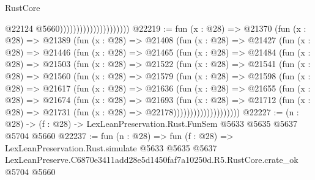\begin{lexlean}{RustCore}
\begin{coremodule}
                                              @22124
                                              @5660)))))))))))))))))))))
@22219 := fun (x : @28) =>
  @21370
    (fun (x : @28) =>
    @21389
      (fun (x : @28) =>
      @21408
        (fun (x : @28) =>
        @21427
          (fun (x : @28) =>
          @21446
            (fun (x : @28) =>
            @21465
              (fun (x : @28) =>
              @21484
                (fun (x : @28) =>
                @21503
                  (fun (x : @28) =>
                  @21522
                    (fun (x : @28) =>
                    @21541
                      (fun (x : @28) =>
                      @21560
                        (fun (x : @28) =>
                        @21579
                          (fun (x : @28) =>
                          @21598
                            (fun (x : @28) =>
                            @21617
                              (fun (x : @28) =>
                              @21636
                                (fun (x : @28) =>
                                @21655
                                  (fun (x : @28) =>
                                  @21674
                                    (fun (x : @28) =>
                                    @21693
                                      (fun (x : @28) =>
                                      @21712
                                        (fun (x : @28) =>
                                        @21731 (fun (x : @28) => @22178))))))))))))))))))))
@22227 := (n : @28) -> (f : @28) -> LexLeanPreservation.Rust.FunSem @5633 @5635 @5637 @5704 @5660
@22237 := fun (n : @28) =>
  fun (f : @28) =>
  LexLeanPreservation.Rust.simulate
    @5633
    @5635
    @5637
    LexLeanPreserve.C6870e3411add28e5d1450faf7a10250d.R5.RustCore.crate_ok
    @5704
    @5660
\end{coremodule}
\end{lexlean}
